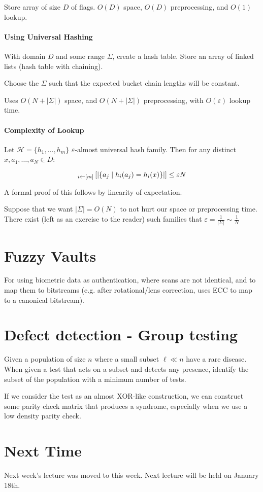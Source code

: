 \documentclass{idc_msc}
\let\E\relax
\DeclareMathOperator*{\E}{E}
\begin{document}
Store array of size \(D\) of flags. \(O(D)\) space, \(O(D)\) preprocessing, and \(O(1)\) lookup.

\paragraph{Using Universal Hashing}

With domain \(D\) and some range \(\Sigma\), create a hash table.
Store an array of linked lists (hash table with chaining).

Choose the \(\Sigma\) such that the expected bucket chain lengths will be constant.

Uses \(O(N + |\Sigma|)\) space, and \(O(N + |\Sigma|)\) preprocessing, with \(O(\varepsilon)\) lookup time.

\paragraph{Complexity of Lookup}

Let \(\mathcal{H} = \{h_1,\ldots,h_m\}\) \(\varepsilon\)-almost universal hash family.
Then for any distinct \(x, a_1, \ldots,a_N \in D\):

\[
\E_{i \gets [m]}\left[|\{a_j \mid h_i(a_j) = h_i(x) \}|\right] \le \varepsilon N
\]

A formal proof of this follows by linearity of expectation.

Suppose that we want \(|\Sigma| = O(N)\) to not hurt our space or preprocessing time.
There exist (left as an exercise to the reader) such families that \(\varepsilon = \frac{1}{|\Sigma|} \sim \frac{1}{N}\)

\section{Fuzzy Vaults}

For using biometric data as authentication, where scans are not identical, and to map them to bitstreams (e.g. after rotational/lens correction, uses ECC to map to a canonical bitstream).

\section{Defect detection - Group testing}

Given a population of size \(n\) where a small subset \(\ell \ll n\) have a rare disease.
When given a test that acts on a subset and detects any presence, identify the subset of the population with a minimum number of tests.

If we consider the test as an almost XOR-like construction, we can construct some parity check matrix that produces a syndrome, especially when we use a low density parity check.

\section{Next Time}

Next week's lecture was moved to this week. Next lecture will be held on January 18th.
\end{document}
